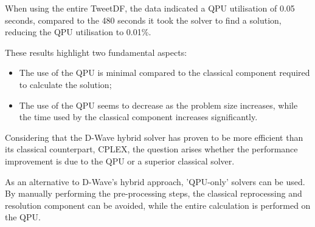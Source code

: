 When using the entire TweetDF, the data indicated a QPU utilisation of 0.05 seconds, compared to the 480 seconds it took the solver to find a solution, reducing the QPU utilisation to 0.01\%.

These results highlight two fundamental aspects: 
\begin{itemize} 
	\item The use of the QPU is minimal compared to the classical component required to calculate the solution; 
	\item The use of the QPU seems to decrease as the problem size increases, while the time used by the classical component increases significantly. 
\end{itemize}

Considering that the D-Wave hybrid solver has proven to be more efficient than its classical counterpart, CPLEX, the question arises whether the performance improvement is due to the QPU or a superior classical solver.

As an alternative to D-Wave's hybrid approach, 'QPU-only' solvers can be used. By manually performing the pre-processing steps, the classical reprocessing and resolution component can be avoided, while the entire calculation is performed on the QPU.